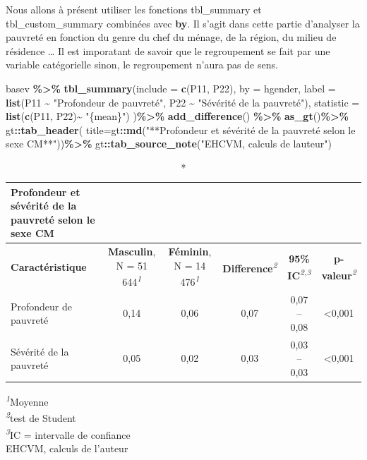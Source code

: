 \documentclass[
]{article}
\newenvironment{Shaded}{\begin{snugshade}}{\end{snugshade}}
\newcommand{\AttributeTok}[1]{\textcolor[rgb]{0.13,0.29,0.53}{#1}}
\newcommand{\FunctionTok}[1]{\textcolor[rgb]{0.13,0.29,0.53}{\textbf{#1}}}
\newcommand{\NormalTok}[1]{#1}
\newcommand{\SpecialCharTok}[1]{\textcolor[rgb]{0.81,0.36,0.00}{\textbf{#1}}}
\newcommand{\StringTok}[1]{\textcolor[rgb]{0.31,0.60,0.02}{#1}}
\begin{document}
Nous allons à présent utiliser les fonctions tbl\_summary et
tbl\_custom\_summary combinées avec \textbf{by}. Il s'agit dans cette
partie d'analyser la pauvreté en fonction du genre du chef du ménage, de
la région, du milieu de résidence \ldots{} Il est imporatant de savoir
que le regroupement se fait par une variable catégorielle sinon, le
regroupement n'aura pas de sens.

\begin{Shaded}
\begin{Highlighting}[]
\NormalTok{basev }\SpecialCharTok{\%\textgreater{}\%}
  \FunctionTok{tbl\_summary}\NormalTok{(}\AttributeTok{include =} \FunctionTok{c}\NormalTok{(P11, P22),}
    \AttributeTok{by =}\NormalTok{ hgender,}
    \AttributeTok{label =} \FunctionTok{list}\NormalTok{(P11 }\SpecialCharTok{\textasciitilde{}} \StringTok{"Profondeur de pauvreté"}\NormalTok{,}
\NormalTok{                 P22 }\SpecialCharTok{\textasciitilde{}} \StringTok{"Sévérité de la pauvreté"}\NormalTok{),}
    \AttributeTok{statistic =} \FunctionTok{list}\NormalTok{(}\FunctionTok{c}\NormalTok{(P11, P22)}\SpecialCharTok{\textasciitilde{}} \StringTok{"\{mean\}"}\NormalTok{) }
\NormalTok{)}\SpecialCharTok{\%\textgreater{}\%}  \FunctionTok{add\_difference}\NormalTok{() }\SpecialCharTok{\%\textgreater{}\%}
  \FunctionTok{as\_gt}\NormalTok{()}\SpecialCharTok{\%\textgreater{}\%}
\NormalTok{  gt}\SpecialCharTok{::}\FunctionTok{tab\_header}\NormalTok{(}
    \AttributeTok{title=}\NormalTok{gt}\SpecialCharTok{::}\FunctionTok{md}\NormalTok{(}\StringTok{"**Profondeur et sévérité de la}
\StringTok{                 pauvreté selon le sexe CM**"}\NormalTok{))}\SpecialCharTok{\%\textgreater{}\%}
\NormalTok{  gt}\SpecialCharTok{::}\FunctionTok{tab\_source\_note}\NormalTok{(}\StringTok{"EHCVM, calculs de l\textquotesingle{}auteur"}\NormalTok{)}
\end{Highlighting}
\end{Shaded}

\setlength{\LTpost}{0mm}
\begin{longtable}{lccccc}
\caption*{
{\large \textbf{Profondeur et sévérité de la
pauvreté selon le sexe CM}}
} \\ 
\toprule
\textbf{Caractéristique} & \textbf{Masculin}, N = 51 644\textsuperscript{\textit{1}} & \textbf{Féminin}, N = 14 476\textsuperscript{\textit{1}} & \textbf{Difference}\textsuperscript{\textit{2}} & \textbf{95\% IC}\textsuperscript{\textit{2,3}} & \textbf{p-valeur}\textsuperscript{\textit{2}} \\ 
\midrule\addlinespace[2.5pt]
Profondeur de pauvreté & 0,14 & 0,06 & 0,07 & 0,07 – 0,08 & <0,001 \\ 
Sévérité de la pauvreté & 0,05 & 0,02 & 0,03 & 0,03 – 0,03 & <0,001 \\ 
\bottomrule
\end{longtable}
\begin{minipage}{\linewidth}
\textsuperscript{\textit{1}}Moyenne\\
\textsuperscript{\textit{2}}test de Student\\
\textsuperscript{\textit{3}}IC = intervalle de confiance\\
EHCVM, calculs de l'auteur\\
\end{minipage}
\end{document}
